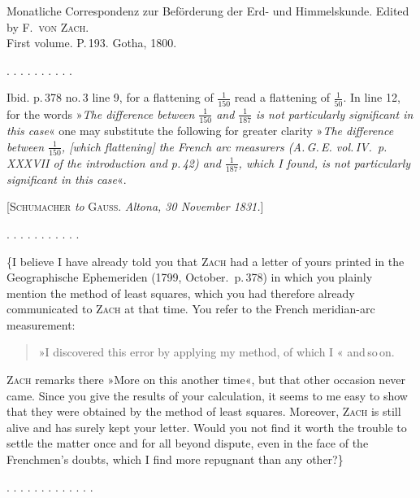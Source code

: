 \clearpage
{}
\begin{center}
Monatliche Correspondenz zur Beförderung der Erd- und Himmelskunde. Edited by F.\ \textsc{von Zach}.\\
First volume. P.\,193. Gotha, 1800.
\end{center}

\begin{center}
\end{center}

\begin{center}
. . . . . . . . . .
\end{center}

Ibid. p.\,378 no.\,3 line 9, for a flattening of $\frac{1}{150}$ read a flattening of $\frac{1}{50}$. In line 12, for the words »\emph{The difference between $\frac{1}{150}$ and $\frac{1}{187}$ is not particularly significant in this case}« one may substitute the following for greater clarity »\emph{The difference between $\frac{1}{150}$, [which flattening] the French arc measurers (A.\,G.\,E. vol.\,IV.\ p.\,XXXVII of the introduction and p.\,42) and $\frac{1}{187}$, which I found, is not particularly significant in this case}«.

\bigskip
\begin{center}
[\textsc{Schumacher} \emph{to} \textsc{Gauss}. \emph{Altona, 30 November 1831.}]
\end{center}

\begin{center}
. . . . . . . . . . .
\end{center}

\{I believe I have already told you that \textsc{Zach} had a letter of yours printed in the Geographische Ephemeriden (1799, October.\ p.\,378) in which you plainly mention the method of least squares, which you had therefore already communicated to \textsc{Zach} at that time. You refer to the French meridian-arc measurement:

\begin{quote}
»I discovered this error by applying my method, of which I « and\,so\,on.
\end{quote}

\textsc{Zach} remarks there »More on this another time«, but that other occasion never came. Since you give the results of your calculation, it seems to me easy to show that they were obtained by the method of least squares. Moreover, \textsc{Zach} is still alive and has surely kept your letter. Would you not find it worth the trouble to settle the matter once and for all beyond dispute, even in the face of the Frenchmen's  doubts, which I find more repugnant than any other?\}

\begin{center}
. . . . . . . . . . . . .
\end{center}
